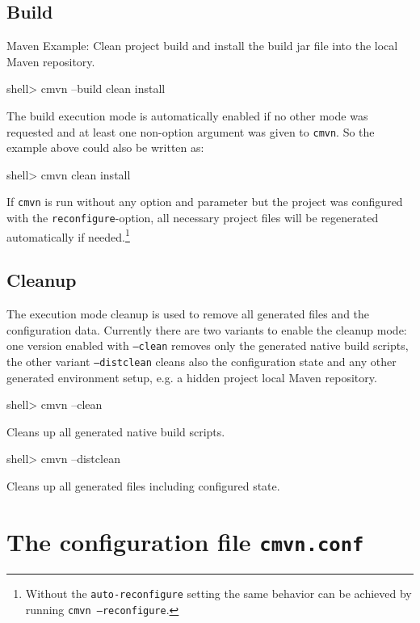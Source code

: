 \documentclass[a4paper,11pt,english,oneside,halfparskip]{scrartcl}
\newcommand{\CMVN}{\texttt{cmvn}}
\newcommand{\cmvn}{\texttt{cmvn}}
\newcommand{\code}[1]{\texttt{#1}}
\begin{document}
\subsection{Build}

Maven Example: Clean project build and install the build jar file into the local Maven repository.

\begin{Cmdline}
shell> cmvn --build clean install
\end{Cmdline}

The build execution mode is automatically enabled if no other mode was requested and at least one non-option argument was given to \CMVN{}. So the example above could also be written as:

\begin{Cmdline}
shell> cmvn clean install
\end{Cmdline}

If \cmvn{} is run without any option and parameter but the project was configured with the \code{reconfigure}-option, all necessary project files will be regenerated automatically if needed.\footnote{Without the \code{auto-reconfigure} setting the same behavior can be achieved by running \code{cmvn --reconfigure}.}



\subsection{Cleanup}

The execution mode cleanup is used to remove all generated files and the configuration data. Currently there are two variants to enable the cleanup mode: one version enabled with \code{--clean} removes only the generated native build scripts, the other variant \code{--distclean} cleans also the configuration state and any other generated environment setup, e.g. a hidden project local Maven repository.

\begin{Cmdline}
shell> cmvn --clean
\end{Cmdline}

Cleans up all generated native build scripts.

\begin{Cmdline}
shell> cmvn --distclean
\end{Cmdline}

Cleans up all generated files including configured state.

\section{The configuration file \texttt{cmvn.conf}}
\end{document}
